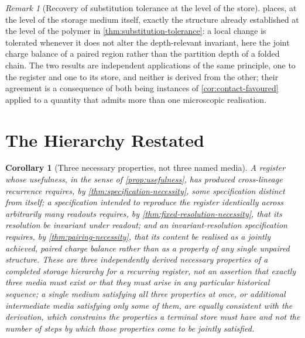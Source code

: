 \documentclass[11pt,twocolumn,a4paper]{article}
\theoremstyle{plain}
\newtheorem{corollary}[theorem]{Corollary}
\theoremstyle{definition}
\theoremstyle{remark}
\newtheorem{remark}[theorem]{Remark}
\begin{document}
\begin{remark}[Recovery of substitution tolerance at the level of the
store]
\label{rem:store-degeneracy}
 places, at the level of the storage
medium itself, exactly the structure already established at the level of
the polymer in \cref{thm:substitution-tolerance}: a local change is
tolerated whenever it does not alter the depth-relevant invariant, here
the joint charge balance of a paired region rather than the partition
depth of a folded chain. The two results are independent applications of
the same principle, one to the register and one to its store, and neither
is derived from the other; their agreement is a consequence of both being
instances of \cref{cor:contact-favoured} applied to a quantity that
admits more than one microscopic realisation.
\end{remark}

\section{The Hierarchy Restated}
\label{sec:hierarchy-restated}

\begin{corollary}[Three necessary properties, not three named media]
\label{cor:hierarchy-summary}
A register whose usefulness, in the sense of \cref{prop:usefulness}, has
produced cross-lineage recurrence requires, by
\cref{thm:specification-necessity}, some specification distinct from
itself; a specification intended to reproduce the register identically
across arbitrarily many readouts requires, by
\cref{thm:fixed-resolution-necessity}, that its resolution be invariant
under readout; and an invariant-resolution specification requires, by
\cref{thm:pairing-necessity}, that its content be realised as a jointly
achieved, paired charge balance rather than as a property of any single
unpaired structure. These are three independently derived necessary
properties of a completed storage hierarchy for a recurring register, not
an assertion that exactly three media must exist or that they must arise
in any particular historical sequence; a single medium satisfying all
three properties at once, or additional intermediate media satisfying
only some of them, are equally consistent with the derivation, which
constrains the properties a terminal store must have and not the number
of steps by which those properties come to be jointly satisfied.
\end{corollary}
\end{document}
